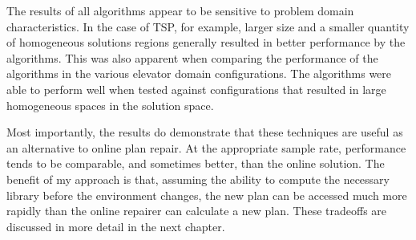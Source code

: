 The results of all algorithms appear to be sensitive to problem domain characteristics.  In the case of TSP, for example, larger size and a smaller quantity of homogeneous solutions regions generally resulted in better performance by the algorithms. This was also apparent when comparing the performance of the algorithms in the various elevator domain configurations.  The algorithms were able to perform well when tested against configurations that resulted in large homogeneous spaces in the solution space.

Most importantly, the results do demonstrate that these techniques are useful as an alternative to online plan repair.  At the appropriate sample rate, performance tends to be comparable, and sometimes better, than the online solution.  The benefit of my approach is that, assuming the ability to compute the necessary library before the environment changes, the new plan can be accessed much more rapidly than the online repairer can calculate a new plan.  These tradeoffs are discussed in more detail in the next chapter.

